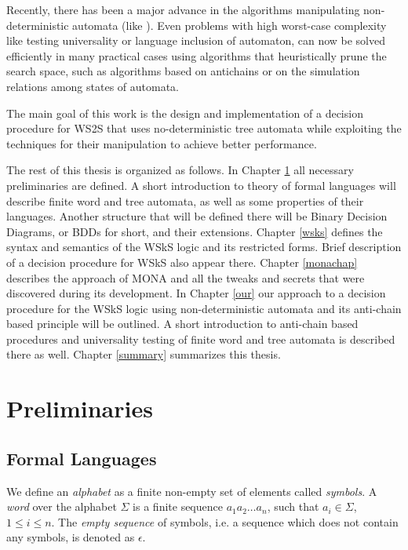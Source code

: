 Recently, there has been a major advance in the algorithms manipulating
non-deter\-mi\-ni\-stic automata (like \cite{vata}). Even problems with high
worst-case complexity like testing universality or language inclusion of automaton, can now be solved efficiently in many practical cases using algorithms that heuristically prune the search space, such as algorithms based on antichains or on the simulation relations among states of automata.

The main goal of this work is the design and implementation of a decision procedure for WS2S that uses no-deterministic tree automata while exploiting the techniques for their manipulation to achieve better performance.

The rest of this thesis is organized as follows. In Chapter \ref{preli} all necessary preliminaries are defined. A short introduction to theory of formal languages will describe finite word and tree automata, as well as some properties of their languages. Another structure that will be defined there will be Binary Decision Diagrams, or BDDs for short, and their extensions. Chapter \ref{wsks} defines the syntax and semantics of the WSkS logic and its restricted forms. Brief description of a decision procedure for WSkS also appear there. Chapter \ref{monachap} describes the approach of \textsc{MONA} and all the tweaks and secrets that were discovered during its development. In Chapter \ref{our} our approach to  a decision procedure for the WSkS logic using non-deterministic automata and its anti-chain based principle will be outlined. A short introduction to anti-chain based procedures and universality testing of finite word and tree automata is described there as well. Chapter \ref{summary} summarizes this thesis.

\chapter{Preliminaries}\label{preli}

 \section{Formal Languages}

 We define an \emph{alphabet} as a finite non-empty set of elements called \emph{symbols}. A \emph{word} over the alphabet $\Sigma$ is a finite sequence $a_1a_2\ldots a_n$, such that $a_i \in \Sigma$, $1 \leq i \leq n$. The \emph{empty sequence} of symbols, i.e. a sequence  which does not contain any symbols, is denoted as $\epsilon$. 

